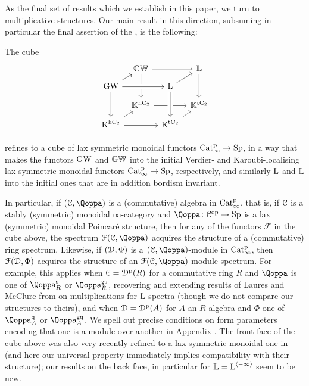 






As the final set of results which we establish in this paper, we turn to multiplicative structures. Our main result in this direction, subsuming in particular the final assertion of the , is the following: 
\begin{theoremintrofour}
\label{theorem:intro-G}%
The cube
\[
\begin{tikzcd}
[column sep=0.5em, row sep=0.7em]
  & \KGW\ar[rr]\ar[dd] && \KL\ar[dd]\\
\GW\ar[ru]\ar[rr, crossing over]\ar[dd] && \L\ar[ur]\\
  & \KK^\hC\ar[rr] && \KK^\tC\\
\K^\hC\ar[rr] \ar[ru] && \K^\tC\ar[uu,<-, crossing over] \ar[ru]\\
\end{tikzcd}
\]
refines to a cube of lax symmetric monoidal functors $\mathrm{Cat}^{\mathrm p}_\infty \rightarrow \mathrm{Sp}$, in a way that makes the functors $\operatorname{GW}$ and $\mathbb{GW}$ into the initial Verdier- and Karoubi-localising lax symmetric monoidal functors $\mathrm{Cat}^{\mathrm p}_\infty \to \mathrm{Sp}$, respectively, and similarly $\operatorname L$ and $\mathbb{L}$ into the initial ones that are in addition bordism invariant. 
\end{theoremintrofour}


In particular, if $(\C,\QF)$ is a (commutative) algebra in $\mathrm{Cat}^{\mathrm p}_\infty$, that is, if $\mathcal C$ is a stably (symmetric) monoidal $\infty$-category and $\QF \colon \C\op \rightarrow \Sp$ is a lax (symmetric) monoidal Poincaré structure, then for any of the functors $\mathcal F$ in the cube above, the spectrum $\F(\C,\QF)$ acquires the structure of a (commutative) ring spectrum. Likewise, if $(\mathcal{D},\Phi)$ is a $(\C,\QF)$-module in $\mathrm{Cat}^{\mathrm p}_\infty$, then $\mathcal{F}(\mathcal{D},\Phi)$ acquires the structure of an $\F(\C,\QF)$-module spectrum. 
For example, this applies when $\mathcal C = {\mathcal D}^{\mathrm{p}}(R)$ for a commutative ring $R$ and $\QF$ is one of $\QF^\sym_R$ or $\QF_R^\mathrm{gs}$, recovering and extending results of Laures and McClure from \cite{laures} on multiplications for $\operatorname L$-spectra (though we do not 
compare our structures to theirs), and when $\mathcal{D}={\mathcal D}^{\mathrm{p}}(A)$ for $A$ an $R$-algebra and $\Phi$ one of $\QF^\qdr_A$ or $\QF^\mathrm{gq}_A$. We spell out precise conditions on form parameters encoding that one is a module over another in Appendix . The front face of the cube above was also very recently refined to a lax symmetric monoidal one in \cite{HSV26} (and here our universal property immediately implies compatibility with their structure); our results on the back face, in particular for $\mathbb{L} = \operatorname L^{\langle -\infty \rangle}$ seem to be new. 


